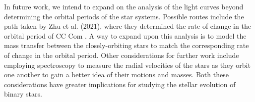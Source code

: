 \documentclass[12pt]{article}
\begin{document}
In future work, we intend to expand on the analysis of the light curves beyond determining the orbital periods of the star systems. Possible routes include the path taken by Zhu et al. (2021), where they determined the rate of change in the orbital period of CC Com \cite{2021RAA....21...84Z}. A way to expand upon this analysis is to model the mass transfer between the closely-orbiting stars to match the corresponding rate of change in the orbital period. Other considerations for further work include employing spectroscopy to measure the radial velocities of the stars as they orbit one another to gain a better idea of their motions and masses. Both these considerations have greater implications for studying the stellar evolution of binary stars.

\newpage
 

\end{document}
